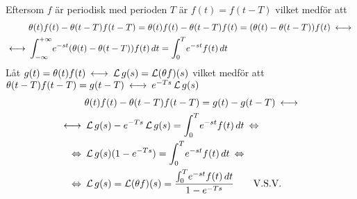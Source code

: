 \begin{task}{3.14}
	Eftersom $f$ är periodisk med perioden $T$ är $f(t)=f(t-T)$ vilket medför att
	\begin{align*}
	&\theta(t)f(t)-\theta(t-T)f(t-T)=
	\theta(t)f(t)-\theta(t-T)f(t)=
	(\theta(t)-\theta(t-T))f(t)\llra \\ \llra
	&\int_{-\infty}^{+\infty}\! e^{-st}(\theta(t)-\theta(t-T))f(t)\, dt=
	\int_{0}^{T}\! e^{-st}f(t)\, dt
	\end{align*}
	Låt $g(t)=\theta(t)f(t)\llra \laplace g(s)=\laplace (\theta f)(s)$ vilket medför att \\
	$\theta(t-T)f(t-T)=g(t-T)\llra e^{-Ts}\laplace g(s)$
	\begin{align*}
	&\theta(t)f(t)-\theta(t-T)f(t-T)=
	g(t)-g(t-T)\llra \\ \llra
	&\laplace g(s)-e^{-Ts}\laplace g(s)=
	\int_{0}^{T}\! e^{-st}f(t)\, dt \lra \\ \lra
	&\laplace g(s)(1-e^{-Ts})=
	\int_{0}^{T}\! e^{-st}f(t)\, dt \lra \\ \lra
	&\laplace g(s)=\laplace(\theta f)(s)=
	\frac{\int_{0}^{T}\! e^{-st}f(t)\, dt}{1-e^{-Ts}} \mproof
	\end{align*}
\end{task}